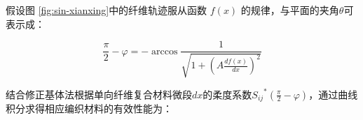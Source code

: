 \begin{figure}[!htb]
\centering
{}
\hspace{0.5cm}
\label{fig:3d-wire}
\end{figure}






假设图	\ref{fig:sin-xianxing}中的纤维轨迹服从函数 $  f\left( x \right)$ 的规律，与平面的夹角$ \theta $可表示成：

\begin{equation}
\frac{\pi }{2} - \varphi   =  - \arccos \frac{1}{{\sqrt {1 + {{\left( {A\frac{{df\left( x \right)}}{{dx}}} \right)}^2}} }}
\end{equation}

结合修正基体法根据单向纤维复合材料微段$ dx $的柔度系数$ {{S_{ij}}^*\left( \frac{\pi }{2} - \varphi  \right)} $，通过曲线积分求得相应编织材料的有效性能为：

